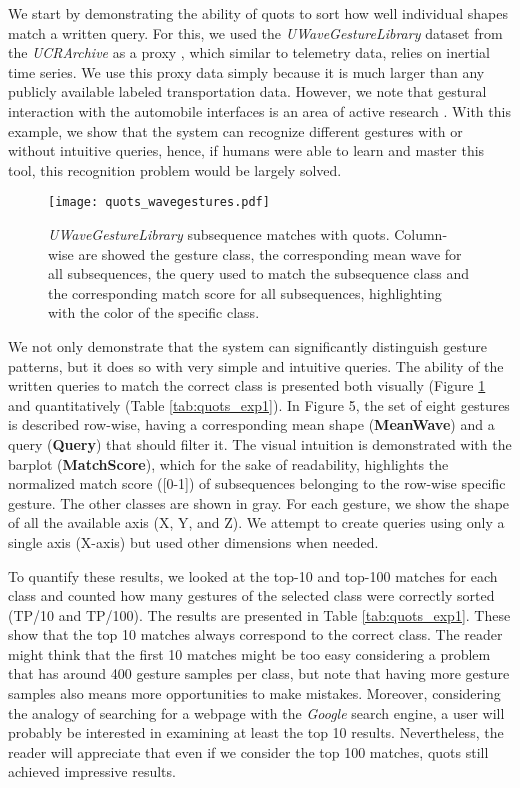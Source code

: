 We start by demonstrating the ability of \gls{quots} to sort how well individual shapes match a written query. For this, we used the \textit{UWaveGestureLibrary} dataset from the \textit{UCRArchive} as a proxy \cite{uWave}, which similar to telemetry data, relies on inertial time series. We use this proxy data simply because it is much larger than any publicly available labeled transportation data. However, we note that gestural interaction with the automobile interfaces is an area of active research \cite{autoui1, autoui2}. With this example, we show that the system can recognize different gestures with or without intuitive queries, hence, if humans were able to learn and master this tool, this recognition problem would be largely solved.

\begin{figure}
\centering
\texttt{[image: quots\_wavegestures.pdf]}
\caption{\textit{UWaveGestureLibrary} subsequence matches with \gls{quots}. Column-wise are showed the gesture class, the corresponding mean wave for all subsequences, the query used to match the subsequence class and the corresponding match score for all subsequences, highlighting with the color of the specific class.}
\label{fig:quots_uwave}
\end{figure}

We not only demonstrate that the system can significantly distinguish gesture patterns, but it does so with very simple and intuitive queries. The ability of the written queries to match the correct class is presented both visually (Figure \ref{fig:quots_uwave} and quantitatively (Table \ref{tab:quots_exp1}). In Figure 5, the set of eight gestures is described row-wise, having a corresponding mean shape (\textbf{MeanWave}) and a query (\textbf{Query}) that should filter it. The visual intuition is demonstrated with the barplot (\textbf{MatchScore}), which for the sake of readability, highlights the normalized match score ([0-1]) of subsequences belonging to the row-wise specific gesture. The other classes are shown in gray. For each gesture, we show the shape of all the available axis (X, Y, and Z). We attempt to create queries using only a single axis (X-axis) but used other dimensions when needed.
\par
To quantify these results, we looked at the top-10 and top-100 matches for each class and counted how many gestures of the selected class were correctly sorted (TP/10 and TP/100). The results are presented in Table \ref{tab:quots_exp1}. These show that the top 10 matches always correspond to the correct class. The reader might think that the first 10 matches might be too easy considering a problem that has around 400 gesture samples per class, but note that having more gesture samples also means more opportunities to make mistakes. Moreover, considering the analogy of searching for a webpage with the \textit{Google} search engine, a user will probably be interested in examining at least the top 10 results. Nevertheless, the reader will appreciate that even if we consider the top 100 matches, \gls{quots} still achieved impressive results.

